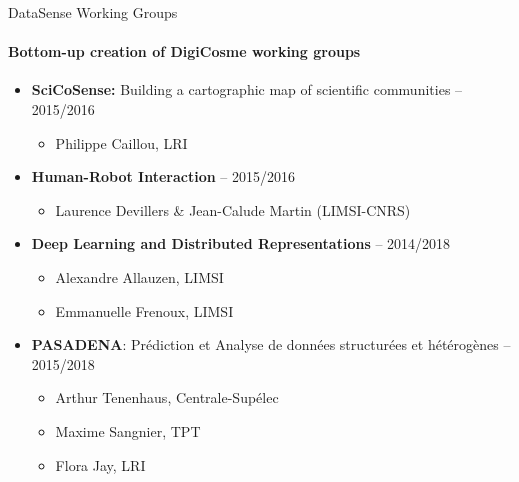 \begin{frame}{DataSense Working Groups}
  \framesubtitle{Bottom-up creation of DigiCosme working groups}

      \begin{itemize}    
      \item \textbf{SciCoSense:} Building a cartographic map of scientific communities -- 2015/2016
        \begin{itemize}
        \item Philippe Caillou, LRI
        \end{itemize}

      \item \textbf{Human-Robot Interaction} -- 2015/2016
        \begin{itemize}
        \item Laurence Devillers \& Jean-Calude Martin (LIMSI-CNRS) 
        \end{itemize}

      \item \textbf{Deep Learning and Distributed Representations} -- 2014/2018
        \begin{itemize}
        \item Alexandre Allauzen, LIMSI 
        \item Emmanuelle Frenoux, LIMSI 
        \end{itemize}

      \item \textbf{PASADENA}: Prédiction et Analyse de données structurées et hétérogènes -- 2015/2018
        \begin{itemize}
          \item Arthur Tenenhaus, Centrale-Supélec
          \item Maxime Sangnier, TPT 
          \item Flora Jay, LRI
        \end{itemize}

      \end{itemize}
\end{frame}

